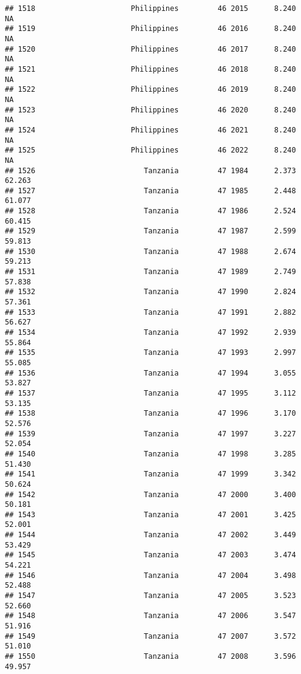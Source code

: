 \documentclass[
]{article}
\begin{document}
\begin{verbatim}
## 1518                      Philippines         46 2015      8.240         NA
## 1519                      Philippines         46 2016      8.240         NA
## 1520                      Philippines         46 2017      8.240         NA
## 1521                      Philippines         46 2018      8.240         NA
## 1522                      Philippines         46 2019      8.240         NA
## 1523                      Philippines         46 2020      8.240         NA
## 1524                      Philippines         46 2021      8.240         NA
## 1525                      Philippines         46 2022      8.240         NA
## 1526                         Tanzania         47 1984      2.373     62.263
## 1527                         Tanzania         47 1985      2.448     61.077
## 1528                         Tanzania         47 1986      2.524     60.415
## 1529                         Tanzania         47 1987      2.599     59.813
## 1530                         Tanzania         47 1988      2.674     59.213
## 1531                         Tanzania         47 1989      2.749     57.838
## 1532                         Tanzania         47 1990      2.824     57.361
## 1533                         Tanzania         47 1991      2.882     56.627
## 1534                         Tanzania         47 1992      2.939     55.864
## 1535                         Tanzania         47 1993      2.997     55.085
## 1536                         Tanzania         47 1994      3.055     53.827
## 1537                         Tanzania         47 1995      3.112     53.135
## 1538                         Tanzania         47 1996      3.170     52.576
## 1539                         Tanzania         47 1997      3.227     52.054
## 1540                         Tanzania         47 1998      3.285     51.430
## 1541                         Tanzania         47 1999      3.342     50.624
## 1542                         Tanzania         47 2000      3.400     50.181
## 1543                         Tanzania         47 2001      3.425     52.001
## 1544                         Tanzania         47 2002      3.449     53.429
## 1545                         Tanzania         47 2003      3.474     54.221
## 1546                         Tanzania         47 2004      3.498     52.488
## 1547                         Tanzania         47 2005      3.523     52.660
## 1548                         Tanzania         47 2006      3.547     51.916
## 1549                         Tanzania         47 2007      3.572     51.010
## 1550                         Tanzania         47 2008      3.596     49.957

\end{verbatim}
\end{document}
